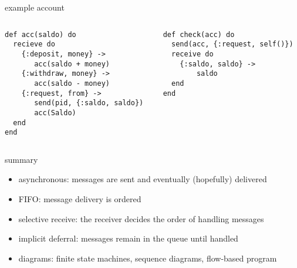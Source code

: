 \begin{frame}[fragile]{example account}

\begin{columns}
   \begin{column}{.45\linewidth}
\begin{verbatim}
def acc(saldo) do
  recieve do
    {:deposit, money} ->
       acc(saldo + money)
    {:withdraw, money} ->
       acc(saldo - money)
    {:request, from} ->
       send(pid, {:saldo, saldo})
       acc(Saldo)
  end
end
\end{verbatim}
\end{column}
\pause
   \begin{column}{.45\linewidth}
\begin{verbatim}
def check(acc) do
  send(acc, {:request, self()})
  receive do
    {:saldo, saldo} ->
        saldo
  end
end
\end{verbatim}
\end{column}
\end{columns}
\end{frame}

\begin{frame}{summary}

\begin{itemize}
\item asynchronous: messages are sent and eventually (hopefully) delivered
\item FIFO: message delivery is ordered
\item selective receive: the receiver decides the order of handling messages
\item implicit deferral: messages remain in the queue until handled
\item diagrams: finite state machines, sequence diagrams, flow-based program
\end{itemize}

\end{frame}







